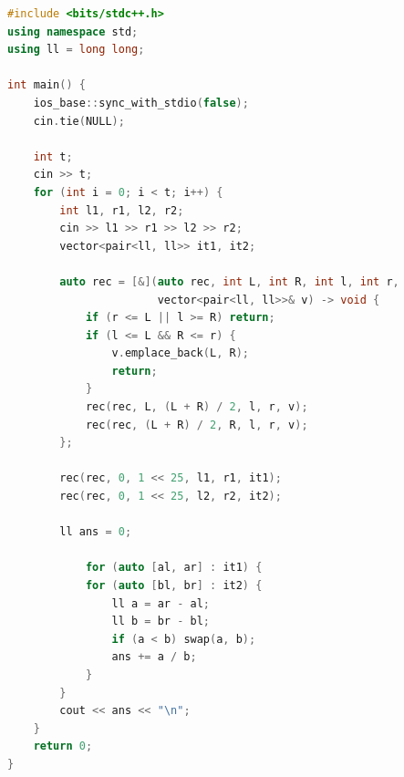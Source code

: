 \begin{lstlisting}[language=C++]
#include <bits/stdc++.h>
using namespace std;
using ll = long long;

int main() {
    ios_base::sync_with_stdio(false);
    cin.tie(NULL);
    
    int t;
    cin >> t;
    for (int i = 0; i < t; i++) {
        int l1, r1, l2, r2;
        cin >> l1 >> r1 >> l2 >> r2;
        vector<pair<ll, ll>> it1, it2;
        
        auto rec = [&](auto rec, int L, int R, int l, int r,
                       vector<pair<ll, ll>>& v) -> void {
            if (r <= L || l >= R) return;
            if (l <= L && R <= r) {
                v.emplace_back(L, R);
                return;
            }
            rec(rec, L, (L + R) / 2, l, r, v);
            rec(rec, (L + R) / 2, R, l, r, v);
        };
        
        rec(rec, 0, 1 << 25, l1, r1, it1);
        rec(rec, 0, 1 << 25, l2, r2, it2);
        
        ll ans = 0;
        
            for (auto [al, ar] : it1) {
            for (auto [bl, br] : it2) {
                ll a = ar - al;
                ll b = br - bl;
                if (a < b) swap(a, b);
                ans += a / b;
            }
        }
        cout << ans << "\n";
    }
    return 0;
}
\end{lstlisting}
